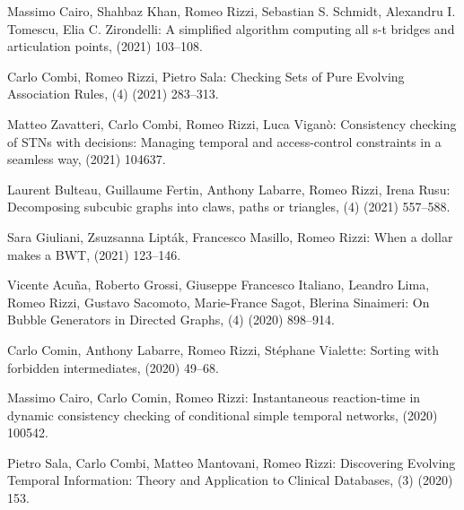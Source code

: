 \begin{etaremune}
  \item {\sc Massimo Cairo, Shahbaz Khan, Romeo Rizzi, Sebastian S. Schmidt, Alexandru I. Tomescu, Elia C. Zirondelli:}
   \newblock A simplified algorithm computing all s-t bridges and articulation points,
    (2021) 103--108.

  \item {\sc Carlo Combi, Romeo Rizzi, Pietro Sala:}
   \newblock Checking Sets of Pure Evolving Association Rules,
   (4) (2021) 283--313.

  \item {\sc Matteo Zavatteri, Carlo Combi, Romeo Rizzi, Luca Viganò:}
   \newblock Consistency checking of STNs with decisions: Managing temporal and access-control constraints in a seamless way,
    (2021) 104637.

  \item {\sc Laurent Bulteau, Guillaume Fertin, Anthony Labarre, Romeo Rizzi, Irena Rusu:}
   \newblock Decomposing subcubic graphs into claws, paths or triangles,
   (4) (2021) 557--588.

  \item {\sc Sara Giuliani, Zsuzsanna Lipták, Francesco Masillo, Romeo Rizzi:}
   \newblock When a dollar makes a BWT,
    (2021) 123--146.

  \item {\sc Vicente Acuña, Roberto Grossi, Giuseppe Francesco Italiano, Leandro Lima, Romeo Rizzi, Gustavo Sacomoto, Marie-France Sagot, Blerina Sinaimeri:}
   \newblock On Bubble Generators in Directed Graphs,
   (4) (2020) 898--914.

  \item {\sc Carlo Comin, Anthony Labarre, Romeo Rizzi, Stéphane Vialette:}
   \newblock Sorting with forbidden intermediates,
    (2020) 49--68.

  \item {\sc Massimo Cairo, Carlo Comin, Romeo Rizzi:}
   \newblock Instantaneous reaction-time in dynamic consistency checking of conditional simple temporal networks,
    (2020) 100542.

  \item {\sc Pietro Sala, Carlo Combi, Matteo Mantovani, Romeo Rizzi:}
   \newblock Discovering Evolving Temporal Information: Theory and Application to Clinical Databases,
   (3) (2020) 153.


\end{etaremune}
